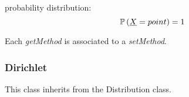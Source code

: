 \begin{description}
\begin{description}
\end{description}

\item[Details:]  \rule{0pt}{1em}
\begin{description}
\item probability distribution:
\begin{equation}
{\mathbb P}\left( {\underline{X}}=point \right) = 1
\end{equation}
\end{description}
\bigskip
\item[Links:]  \rule{0pt}{1em}

\end{description}


Each  \textit{getMethod}  is associated to a \textit{setMethod}.


\newpage
\subsubsection{Dirichlet}


This class inherits from the Distribution class.

